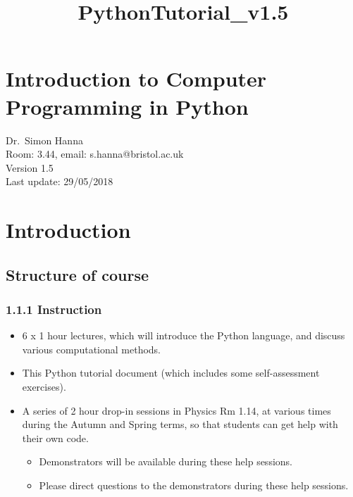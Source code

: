 \documentclass[10pt]{article}
\title{PythonTutorial\_v1.5}
\providecommand{\tightlist}{%
      \setlength{\itemsep}{0pt}\setlength{\parskip}{0pt}}
\begin{document}
    
    
    

    
    \hypertarget{introduction-to-computer-programming-in-python}{%
\section*{Introduction to Computer Programming in
Python}\label{introduction-to-computer-programming-in-python}}

    Dr.~Simon Hanna \\
    Room: 3.44, email: s.hanna@bristol.ac.uk \\
    Version 1.5 \\
    Last update: 29/05/2018

    \tableofcontents


    \hypertarget{introduction}{%
\section{Introduction}\label{introduction}}
    \hypertarget{structure-of-course}{%
\subsection{Structure of course}\label{structure-of-course}}

    \hypertarget{instruction}{%
\subsubsection*{1.1.1 Instruction}\label{instruction}}

\begin{itemize}
\tightlist
\item
  6 x 1 hour lectures, which will introduce the Python language, and
  discuss various computational methods.
\item
  This Python tutorial document (which includes some self-assessment
  exercises).
\item
  A series of 2 hour drop-in sessions in Physics Rm 1.14, at various
  times during the Autumn and Spring terms, so that students can get
  help with their own code.

  \begin{itemize}
  \tightlist
  \item
    Demonstrators will be available during these help sessions.
  \item
    Please direct questions to the demonstrators during these help
    sessions.
  \end{itemize}
\end{itemize}
\end{document}

